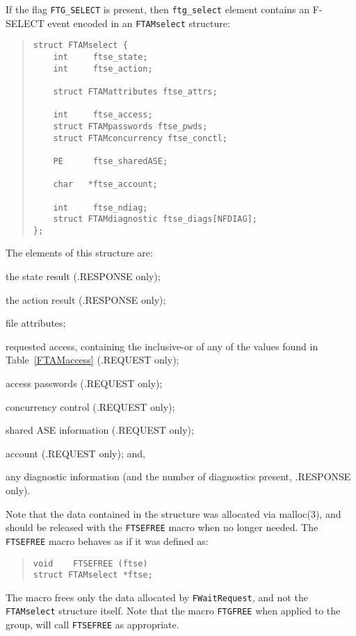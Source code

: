 If the flag \verb"FTG_SELECT" is present,
then \verb"ftg_select" element contains an {\sf F-SELECT\/} event encoded in an
\verb"FTAMselect" structure:
\begin{quote}\small\begin{verbatim}
struct FTAMselect {
    int     ftse_state;
    int     ftse_action;

    struct FTAMattributes ftse_attrs;

    int	    ftse_access;
    struct FTAMpasswords ftse_pwds;
    struct FTAMconcurrency ftse_conctl;

    PE      ftse_sharedASE;

    char   *ftse_account;

    int	    ftse_ndiag;
    struct FTAMdiagnostic ftse_diags[NFDIAG];
};
\end{verbatim}\end{quote}
The elements of this structure are:
\begin{describe}
\item[\verb"ftse\_state":] the state result ({\sf .RESPONSE\/} only);

\item[\verb"ftse\_action":] the action result ({\sf .RESPONSE\/} only);

\item[\verb"ftse\_attrs":] file attributes;

\item[\verb"ftse\_access":] requested access,
containing the inclusive-or of any of the values
found in Table~\ref{FTAMaccess} ({\sf .REQUEST\/} only);

\item[\verb"ftse\_pwds":] access passwords ({\sf .REQUEST\/} only);

\item[\verb"ftse\_conctl":] concurrency control ({\sf .REQUEST\/} only);

\item[\verb"ftse\_sharedASE":] shared ASE information ({\sf .REQUEST\/} only);

\item[\verb"ftse\_account":] account ({\sf .REQUEST\/} only);
and,

\item[\verb"ftse\_diags"/\verb"ftse\_ndiag":] any diagnostic information
(and the number of diagnostics present, {\sf .RESPONSE\/} only).
\end{describe}
Note that the data contained in the structure was allocated via \man malloc(3),
and should be released with the \verb"FTSEFREE" macro when no longer needed.
The \verb"FTSEFREE" macro
behaves as if it was defined as:
\begin{quote}\small\begin{verbatim}
void    FTSEFREE (ftse)
struct FTAMselect *ftse;
\end{verbatim}\end{quote}
The macro frees only the data allocated by \verb"FWaitRequest",
and not the \verb"FTAMselect" structure itself.
Note that the macro \verb"FTGFREE" when applied to the group,
will call \verb"FTSEFREE" as appropriate.

